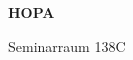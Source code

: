 \documentclass[a4paper]{article}
\begin{document}
\printGenericVSLHeader
\begin{center}
\begin{vsltext}{3cm}{4cm}

   \vspace{0.5cm} 

    \textbf{HOPA} 

    \vspace{1.5cm}

    Seminarraum 138C

\end{vsltext}

\end{center}
\end{document}
